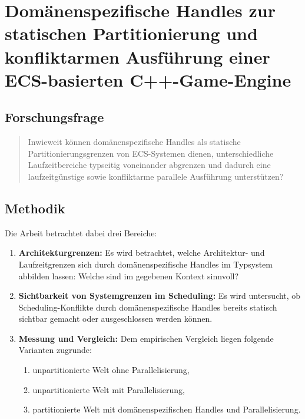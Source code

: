 \chapter{Domänenspezifische Handles zur statischen Partitionierung und konfliktarmen Ausführung einer ECS-basierten C++-Game-Engine}\label{ch:vorschlag2}

\section{Forschungsfrage}

\begin{quote}
    Inwieweit können domänenspezifische Handles als statische Partitionierungsgrenzen von ECS-Systemen dienen, unterschiedliche Laufzeitbereiche typseitig voneinander abgrenzen und dadurch eine laufzeitgünstige sowie konfliktarme parallele Ausführung unterstützen?
\end{quote}

\section{Methodik}

Die Arbeit betrachtet dabei drei Bereiche:

\begin{enumerate}
    \item \textbf{Architekturgrenzen:}
    Es wird betrachtet, welche Architektur- und Laufzeitgrenzen sich durch domänenspezifische Handles im Typsystem abbilden lassen: Welche sind im gegebenen Kontext sinnvoll?

    \item \textbf{Sichtbarkeit von Systemgrenzen im Scheduling:}
    Es wird untersucht, ob Scheduling-Konflikte durch domänenspezifische Handles bereits statisch sichtbar gemacht oder ausgeschlossen werden können.

    \item \textbf{Messung und Vergleich:}
    Dem empirischen Vergleich liegen folgende Varianten zugrunde:
    \begin{enumerate}
        \item unpartitionierte Welt ohne Parallelisierung,
        \item unpartitionierte Welt mit Parallelisierung,
        \item partitionierte Welt mit domänenspezifischen Handles und Parallelisierung.
    \end{enumerate}
\end{enumerate}

